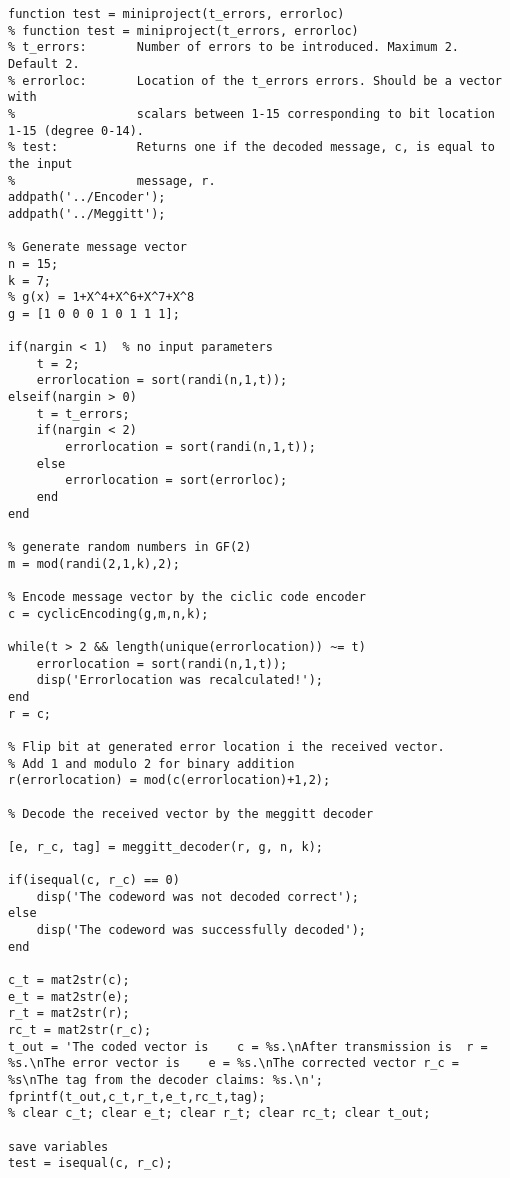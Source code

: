 \documentclass[Main]{subfiles}
\begin{document}
\begin{lstlisting}[caption=Main Function, style=Code-Matlab, label=lst:refID]
function test = miniproject(t_errors, errorloc)
% function test = miniproject(t_errors, errorloc)
% t_errors:       Number of errors to be introduced. Maximum 2. Default 2.
% errorloc:       Location of the t_errors errors. Should be a vector with
%                 scalars between 1-15 corresponding to bit location 1-15 (degree 0-14).
% test:           Returns one if the decoded message, c, is equal to the input
%                 message, r.
addpath('../Encoder');
addpath('../Meggitt');

% Generate message vector
n = 15;
k = 7;
% g(x) = 1+X^4+X^6+X^7+X^8
g = [1 0 0 0 1 0 1 1 1];

if(nargin < 1)  % no input parameters
    t = 2;
    errorlocation = sort(randi(n,1,t));
elseif(nargin > 0)
    t = t_errors;
    if(nargin < 2)
        errorlocation = sort(randi(n,1,t));
    else
        errorlocation = sort(errorloc);
    end
end

% generate random numbers in GF(2)
m = mod(randi(2,1,k),2);

% Encode message vector by the ciclic code encoder
c = cyclicEncoding(g,m,n,k);

while(t > 2 && length(unique(errorlocation)) ~= t)
    errorlocation = sort(randi(n,1,t));
    disp('Errorlocation was recalculated!');
end
r = c;

% Flip bit at generated error location i the received vector.
% Add 1 and modulo 2 for binary addition
r(errorlocation) = mod(c(errorlocation)+1,2);

% Decode the received vector by the meggitt decoder

[e, r_c, tag] = meggitt_decoder(r, g, n, k);

if(isequal(c, r_c) == 0)
    disp('The codeword was not decoded correct');
else
    disp('The codeword was successfully decoded');
end

c_t = mat2str(c);
e_t = mat2str(e);
r_t = mat2str(r);
rc_t = mat2str(r_c);
t_out = 'The coded vector is    c = %s.\nAfter transmission is  r = %s.\nThe error vector is    e = %s.\nThe corrected vector r_c = %s\nThe tag from the decoder claims: %s.\n';
fprintf(t_out,c_t,r_t,e_t,rc_t,tag);
% clear c_t; clear e_t; clear r_t; clear rc_t; clear t_out;

save variables
test = isequal(c, r_c);
\end{lstlisting}
\end{document}

